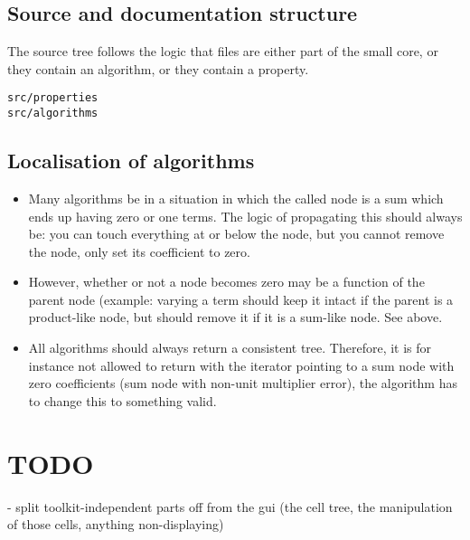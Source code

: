 \documentclass[11pt]{article}
\begin{document}
\subsection{Source and documentation structure}

The source tree follows the logic that files are either part of the
small core, or they contain an algorithm, or they contain a property. 
\begin{verbatim}
src/properties
src/algorithms
\end{verbatim}

\subsection{Localisation of algorithms}

\begin{itemize}
\item Many algorithms be in a situation in which the called
  node is a sum which ends up having zero or one terms. The logic of
  propagating this should always be: you can touch everything at or
  below the node, but you cannot remove the node, only set its
  coefficient to zero. 

\item However, whether or not a node becomes zero may be a function of
  the parent node (example: varying a term should keep it intact if
  the parent is a product-like node, but should remove it if it is a
  sum-like node. See above.

\item All algorithms should always return a consistent
  tree. Therefore, it is for instance not allowed to return with the
  iterator pointing to a sum node with zero coefficients (sum node
  with non-unit multiplier error), the algorithm has to change this to
  something valid.

\end{itemize}


\section{TODO}

- split toolkit-independent parts off from the gui (the cell tree,
  the manipulation of those cells, anything non-displaying)
\end{document}
